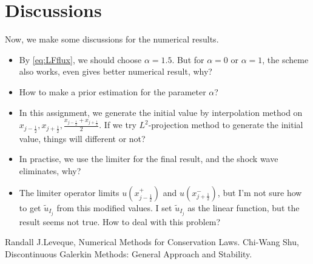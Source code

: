 \documentclass[a4paper]{article}
\begin{document}
\section{Discussions}
Now, we make some discussions for the numerical results. 
\begin{itemize}
    \item By \eqref{eq:LFflux}, we should choose $\alpha=1.5$. 
    But for $\alpha=0$ or $\alpha=1$, the scheme also works, even gives better numerical 
    result, why?
    \item How to make a prior estimation for the parameter $\alpha$?
    \item In this assignment, we generate the initial value by interpolation method 
    on $x_{j-\frac{1}{2}},x_{j+\frac{1}{2}},\frac{x_{j-\frac{1}{2}}+x_{j+\frac{1}{2}}}{2}$. 
    If we try $L^{2}$-projection method to generate the initial value, things will 
    different or not?
    \item In practise, we use the limiter for the final result, and the shock wave 
    eliminates, why? 
    \item The limiter operator limits $u(x_{j-\frac{1}{2}}^{+})$ and $u(x_{j+\frac{1}{2}}^{-})$, 
    but I'm not sure how to get $\tilde{u}_{I_{j}}$ from this modified values. 
    I set $\tilde{u}_{I_j}$ as the linear function, but the result seems not true. 
    How to deal with this problem?
\end{itemize}
\begin{thebibliography}{99}
     Randall J.Leveque, Numerical Methods for Conservation Laws.
     Chi-Wang Shu, Discontinuous Galerkin Methods: General Approach and Stability.
\end{thebibliography}
\end{document}
